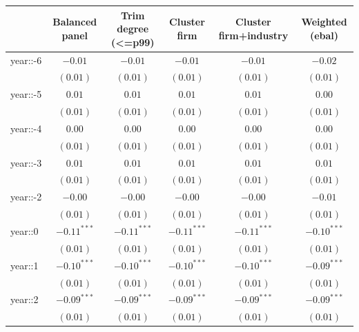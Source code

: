 
\begin{table}
\begin{center}
\begin{tabular}{l c c c c c}
\hline
 & Balanced panel & Trim degree (<=p99) & Cluster firm & Cluster firm+industry & Weighted (ebal) \\
\hline
year::-6                & $-0.01$       & $-0.01$       & $-0.01$       & $-0.01$       & $-0.02$       \\
                        & $(0.01)$      & $(0.01)$      & $(0.01)$      & $(0.01)$      & $(0.01)$      \\
year::-5                & $0.01$        & $0.01$        & $0.01$        & $0.01$        & $0.00$        \\
                        & $(0.01)$      & $(0.01)$      & $(0.01)$      & $(0.01)$      & $(0.01)$      \\
year::-4                & $0.00$        & $0.00$        & $0.00$        & $0.00$        & $0.00$        \\
                        & $(0.01)$      & $(0.01)$      & $(0.01)$      & $(0.01)$      & $(0.01)$      \\
year::-3                & $0.01$        & $0.01$        & $0.01$        & $0.01$        & $0.01$        \\
                        & $(0.01)$      & $(0.01)$      & $(0.01)$      & $(0.01)$      & $(0.01)$      \\
year::-2                & $-0.00$       & $-0.00$       & $-0.00$       & $-0.00$       & $-0.01$       \\
                        & $(0.01)$      & $(0.01)$      & $(0.01)$      & $(0.01)$      & $(0.01)$      \\
year::0                 & $-0.11^{***}$ & $-0.11^{***}$ & $-0.11^{***}$ & $-0.11^{***}$ & $-0.10^{***}$ \\
                        & $(0.01)$      & $(0.01)$      & $(0.01)$      & $(0.01)$      & $(0.01)$      \\
year::1                 & $-0.10^{***}$ & $-0.10^{***}$ & $-0.10^{***}$ & $-0.10^{***}$ & $-0.09^{***}$ \\
                        & $(0.01)$      & $(0.01)$      & $(0.01)$      & $(0.01)$      & $(0.01)$      \\
year::2                 & $-0.09^{***}$ & $-0.09^{***}$ & $-0.09^{***}$ & $-0.09^{***}$ & $-0.09^{***}$ \\
                        & $(0.01)$      & $(0.01)$      & $(0.01)$      & $(0.01)$      & $(0.01)$      \\

\end{tabular}
\end{center}
\end{table}
